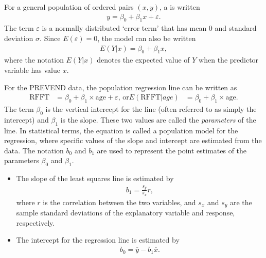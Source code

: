 For a general population of ordered pairs $(x,y)$, a  is written 
\begin{align*}
	 y = \beta_0 + \beta_1x + \varepsilon.
\end{align*}
The term $\varepsilon$ is a normally distributed `error term' that has mean 0 and standard deviation $\sigma$. Since $E(\varepsilon) = 0$,  the model can also be written
\begin{align*}
	E(Y|x) = \beta_0 + \beta_1 x,
\end{align*}
where the notation $E(Y|x)$ denotes the expected value of $Y$ when the predictor variable has value $x$. 

For the PREVEND data, the population regression line can be written as
\begin{align*}
  \text{RFFT} &= \beta_0 + \beta_{1}\times \text{age} + \varepsilon, \, \text{or}
 E (\text{RFFT}| age) &= \beta_0 + \beta_{1}\times \text{age}.
\end{align*}
The term $\beta_0$ is the vertical intercept for the line (often referred to as simply the intercept) and $\beta_1$ is the slope.  These two values are called the \emph{parameters} of the line.  In statistical terms, the equation is called a population model for the regression, where specific values of the slope and intercept are estimated from the data. The notation $b_0$ and $b_1$ are used to represent the point estimates of the parameters $\beta_0$ and $\beta_1$.


\begin{itemize}
\item The slope of the least squares line is estimated by
\begin{eqnarray}
b_1 = \frac{s_y}{s_x} r,
\label{slopeOfLSRLine}
\end{eqnarray}
where $r$ is the correlation between the two variables, and $s_x$ and $s_y$ are the sample standard deviations of the explanatory variable and response, respectively.
\item The intercept for the regression line is estimated by
\begin{eqnarray}
b_0 = \overline{y} - b_1\overline{x}.
\label{interceptOfLSRLine}
\end{eqnarray}
\end{itemize}

